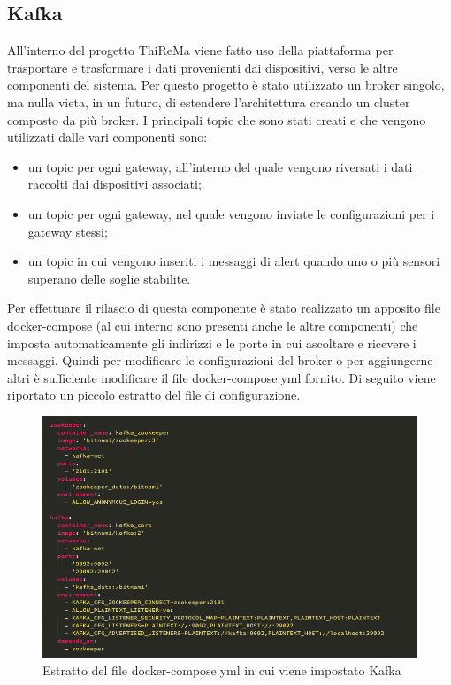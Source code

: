 \subsection{Kafka}
	All'interno del progetto ThiReMa viene fatto uso della piattaforma  per trasportare e trasformare i dati provenienti dai dispositivi, verso le altre componenti del sistema.
	\newline
	Per questo progetto è stato utilizzato un broker singolo, ma nulla vieta, in un futuro, di estendere l'architettura creando un cluster composto da più broker.
	\newline
	\newline
	I principali topic che sono stati creati e che vengono utilizzati dalle vari componenti sono:
	\begin{itemize}
		\item un topic per ogni gateway, all'interno del quale vengono riversati i dati raccolti dai dispositivi associati;
		\item un topic per ogni gateway, nel quale vengono inviate le configurazioni per i gateway stessi;
		\item un topic in cui vengono inseriti i messaggi di alert quando uno o più sensori superano delle 
		soglie stabilite.
	\end{itemize}
	Per effettuare il rilascio di questa componente è stato realizzato un apposito file docker-compose (al cui interno sono presenti anche le altre componenti) che imposta automaticamente gli indirizzi e le porte in cui ascoltare e ricevere i messaggi. Quindi per modificare le configurazioni del broker  o per aggiungerne altri è sufficiente modificare il file docker-compose.yml fornito.
	\newline
	Di seguito viene riportato un piccolo estratto del file di configurazione.

		\begin{figure}[H]
			\centering
			\includegraphics[scale=0.470]{res/images/estrattoKafka_dockerCompose.png}
			\caption{Estratto del file docker-compose.yml in cui viene impostato Kafka}
			\label{Immagine 1}
		\end{figure}
	\pagebreak
